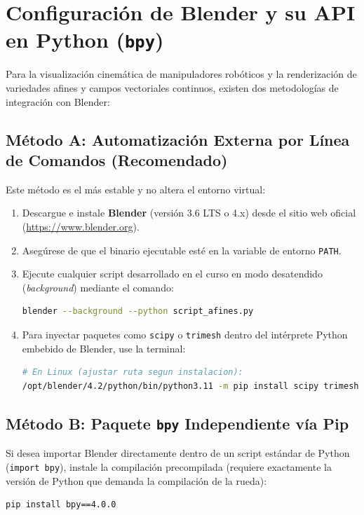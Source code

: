 \documentclass[11pt, a4paper]{article}
\begin{document}
\section{Configuración de Blender y su API en Python (\texttt{bpy})}

Para la visualización cinemática de manipuladores robóticos y la renderización de variedades afines y campos vectoriales continuos, existen dos metodologías de integración con Blender:

\subsection{Método A: Automatización Externa por Línea de Comandos (Recomendado)}
Este método es el más estable y no altera el entorno virtual:
\begin{enumerate}
    \item Descargue e instale \textbf{Blender} (versión 3.6 LTS o 4.x) desde el sitio web oficial (\url{https://www.blender.org}).
    \item Asegúrese de que el binario ejecutable esté en la variable de entorno \texttt{PATH}.
    \item Ejecute cualquier script desarrollado en el curso en modo desatendido (\emph{background}) mediante el comando:
\begin{lstlisting}[language=bash]
blender --background --python script_afines.py
\end{lstlisting}
    \item Para inyectar paquetes como \texttt{scipy} o \texttt{trimesh} dentro del intérprete Python embebido de Blender, use la terminal:
\begin{lstlisting}[language=bash]
# En Linux (ajustar ruta segun instalacion):
/opt/blender/4.2/python/bin/python3.11 -m pip install scipy trimesh
\end{lstlisting}
\end{enumerate}

\subsection{Método B: Paquete \texttt{bpy} Independiente vía Pip}
Si desea importar Blender directamente dentro de un script estándar de Python (\texttt{import bpy}), instale la compilación precompilada (requiere exactamente la versión de Python que demanda la compilación de la rueda):
\begin{lstlisting}[language=bash]
pip install bpy==4.0.0
\end{lstlisting}
\end{document}
